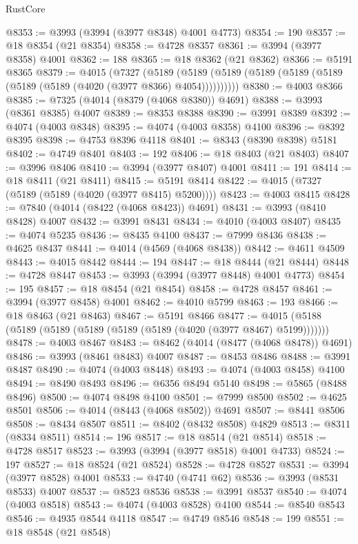 \begin{lexlean}{RustCore}
\begin{coremodule}
@8353 := @3993 (@3994 (@3977 @8348) @4001 @4773)
@8354 := 190
@8357 := @18 @8354 (@21 @8354)
@8358 := @4728 @8357
@8361 := @3994 (@3977 @8358) @4001
@8362 := 188
@8365 := @18 @8362 (@21 @8362)
@8366 := @5191 @8365
@8379 := @4015
    (@7327
      (@5189 (@5189 (@5189 (@5189 (@5189 (@5189 (@5189 (@5189 (@4020 (@3977 @8366) @4054))))))))))
@8380 := @4003 @8366
@8385 := @7325 (@4014 (@8379 (@4068 @8380)) @4691)
@8388 := @3993 (@8361 @8385) @4007
@8389 := @8353 @8388
@8390 := @3991 @8389
@8392 := @4074 (@4003 @8348)
@8395 := @4074 (@4003 @8358) @4100
@8396 := @8392 @8395
@8398 := @4753 @8396 @4118
@8401 := @8343 (@8390 @8398) @5181
@8402 := @4749 @8401
@8403 := 192
@8406 := @18 @8403 (@21 @8403)
@8407 := @3996 @8406
@8410 := @3994 (@3977 @8407) @4001
@8411 := 191
@8414 := @18 @8411 (@21 @8411)
@8415 := @5191 @8414
@8422 := @4015 (@7327 (@5189 (@5189 (@4020 (@3977 @8415) @5200))))
@8423 := @4003 @8415
@8428 := @7840 (@4014 (@8422 (@4068 @8423)) @4691)
@8431 := @3993 (@8410 @8428) @4007
@8432 := @3991 @8431
@8434 := @4010 (@4003 @8407)
@8435 := @4074 @5235
@8436 := @8435 @4100
@8437 := @7999 @8436
@8438 := @4625 @8437
@8441 := @4014 (@4569 (@4068 @8438))
@8442 := @4611 @4509
@8443 := @4015 @8442
@8444 := 194
@8447 := @18 @8444 (@21 @8444)
@8448 := @4728 @8447
@8453 := @3993 (@3994 (@3977 @8448) @4001 @4773)
@8454 := 195
@8457 := @18 @8454 (@21 @8454)
@8458 := @4728 @8457
@8461 := @3994 (@3977 @8458) @4001
@8462 := @4010 @5799
@8463 := 193
@8466 := @18 @8463 (@21 @8463)
@8467 := @5191 @8466
@8477 := @4015 (@5188 (@5189 (@5189 (@5189 (@5189 (@5189 (@4020 (@3977 @8467) @5199)))))))
@8478 := @4003 @8467
@8483 := @8462 (@4014 (@8477 (@4068 @8478)) @4691)
@8486 := @3993 (@8461 @8483) @4007
@8487 := @8453 @8486
@8488 := @3991 @8487
@8490 := @4074 (@4003 @8448)
@8493 := @4074 (@4003 @8458) @4100
@8494 := @8490 @8493
@8496 := @6356 @8494 @5140
@8498 := @5865 (@8488 @8496)
@8500 := @4074 @8498 @4100
@8501 := @7999 @8500
@8502 := @4625 @8501
@8506 := @4014 (@8443 (@4068 @8502)) @4691
@8507 := @8441 @8506
@8508 := @8434 @8507
@8511 := @8402 (@8432 @8508) @4829
@8513 := @8311 (@8334 @8511)
@8514 := 196
@8517 := @18 @8514 (@21 @8514)
@8518 := @4728 @8517
@8523 := @3993 (@3994 (@3977 @8518) @4001 @4733)
@8524 := 197
@8527 := @18 @8524 (@21 @8524)
@8528 := @4728 @8527
@8531 := @3994 (@3977 @8528) @4001
@8533 := @4740 (@4741 @62)
@8536 := @3993 (@8531 @8533) @4007
@8537 := @8523 @8536
@8538 := @3991 @8537
@8540 := @4074 (@4003 @8518)
@8543 := @4074 (@4003 @8528) @4100
@8544 := @8540 @8543
@8546 := @4935 @8544 @4118
@8547 := @4749 @8546
@8548 := 199
@8551 := @18 @8548 (@21 @8548)

\end{coremodule}
\end{lexlean}
